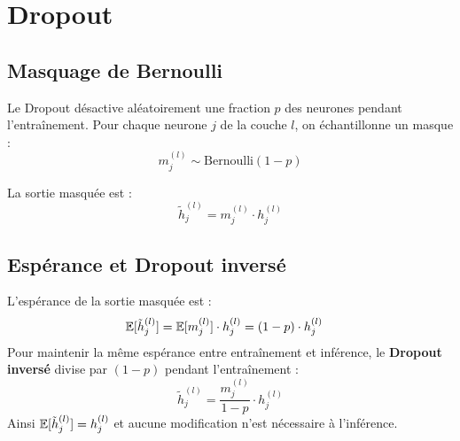 \section{Dropout}
\label{sec:dropout}

\subsection{Masquage de Bernoulli}

Le Dropout \cite{srivastava2014dropout} d\'esactive al\'eatoirement une
fraction $p$ des neurones pendant l'entra\^inement. Pour chaque neurone $j$
de la couche $l$, on \'echantillonne un masque :
\begin{equation}
m_j^{(l)} \sim \text{Bernoulli}(1 - p)
\end{equation}

La sortie masqu\'ee est :
\begin{equation}
\tilde{h}_j^{(l)} = m_j^{(l)} \cdot h_j^{(l)}
\end{equation}

\subsection{Esp\'erance et Dropout invers\'e}

\begin{theoreme}
L'esp\'erance de la sortie masqu\'ee est :
\begin{align}
\mathbb{E}[\tilde{h}_j^{(l)}]
&= \mathbb{E}[m_j^{(l)}] \cdot h_j^{(l)} = (1 - p) \cdot h_j^{(l)}
\end{align}
Pour maintenir la m\^eme esp\'erance entre entra\^inement et inf\'erence,
le \textbf{Dropout invers\'e} divise par $(1-p)$ pendant l'entra\^inement :
\begin{equation}
\tilde{h}_j^{(l)} = \frac{m_j^{(l)}}{1 - p} \cdot h_j^{(l)}
\label{eq:inverted-dropout}
\end{equation}
Ainsi $\mathbb{E}[\tilde{h}_j^{(l)}] = h_j^{(l)}$ et aucune modification n'est
n\'ecessaire \`a l'inf\'erence.
\end{theoreme}

